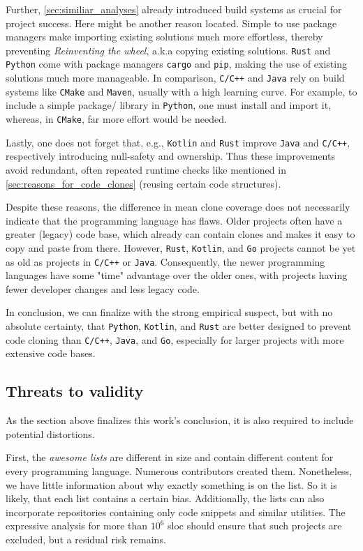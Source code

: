Further, \autoref{sec:similiar_analyses} already introduced build systems as crucial for project success. Here might be another reason located. Simple to use package managers make importing existing solutions much more effortless, thereby preventing \textit{Reinventing the wheel}, a.k.a copying existing solutions. \texttt{Rust} and \texttt{Python} come with package managers \texttt{cargo} and \texttt{pip}, making the use of existing solutions much more manageable. In comparison, \texttt{C/C++} and \texttt{Java} rely on build systems like \texttt{CMake} and \texttt{Maven}, usually with a high learning curve. For example, to include a simple package/ library in \texttt{Python}, one must install and import it, whereas, in \texttt{CMake}, far more effort would be needed.

Lastly, one does not forget that, e.g., \texttt{Kotlin} and \texttt{Rust} improve \texttt{Java} and \texttt{C/C++}, respectively introducing null-safety and ownership. Thus these improvements avoid redundant, often repeated runtime checks like mentioned in \autoref{sec:reasons_for_code_clones} (reusing certain code structures).

Despite these reasons, the difference in mean clone coverage does not necessarily indicate that the programming language has flaws.
Older projects often have a greater (legacy) code base, which already can contain clones and makes it easy to copy and paste from there. 
However, \texttt{Rust}, \texttt{Kotlin}, and \texttt{Go} projects cannot be yet as old as projects in \texttt{C/C++} or \texttt{Java}. Consequently, the newer programming languages have some "time" advantage over the older ones, with projects having fewer developer changes and less legacy code.

In conclusion, we can finalize with the strong empirical suspect, but with no absolute certainty, that \texttt{Python}, \texttt{Kotlin}, and \texttt{Rust} are better designed to prevent code cloning than \texttt{C/C++}, \texttt{Java}, and \texttt{Go}, especially for larger projects with more extensive code bases.

 
\subsection{Threats to validity}

As the section above finalizes this work's conclusion, it is also required to include potential distortions.

First, the \textit{awesome lists} are different in size and contain different content for every programming language. Numerous contributors created them. Nonetheless, we have little information about why exactly something is on the list. So it is likely, that each list contains a certain bias. Additionally, the lists can also incorporate repositories containing only code snippets and similar utilities. The expressive analysis for more than $10^6$ \ac{sloc} should ensure that such projects are excluded, but a residual risk remains.


